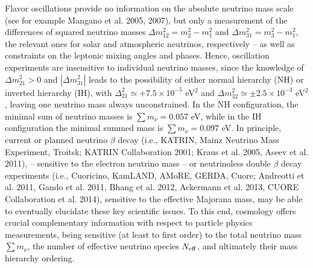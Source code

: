 \documentclass{emulateapj}
\begin{document}
Flavor oscillations provide no information on the absolute neutrino mass scale (see for example Mangano et al. 2005, 2007), 
but only a measurement of the differences of squared neutrino masses $\Delta m^2_{12}= m^2_2 - m^2_1$ and $\Delta m^2_{31} = m^2_3 - m^2_1$, the
relevant ones for solar and atmospheric neutrinos, respectively -- as well as constraints on the leptonic mixing angles and phases. Hence, oscillation experiments
are insensitive to individual neutrino masses, since the knowledge of
$\Delta m^2_{21} > 0$   and $| \Delta m ^2_{31}|$   leads to the possibility of either normal hierarchy (NH) or inverted hierarchy (IH), 
with $\Delta^2_{21} \simeq + 7.5 \times 10^{-5}$ eV$^{2}$  and $\Delta m_{32}^2 \simeq \pm 2.5 \times 10^{-3}$ eV$^2$,
leaving one neutrino mass always unconstrained.
In the NH configuration, the minimal sum of neutrino masses is $\sum m_{\nu} = 0.057$ eV, while in the IH configuration
the minimal summed mass is $\sum m_{\nu} = 0.097$ eV.
In principle, current or planned neutrino $\beta$ decay (i.e., KATRIN, Mainz Neutrino Mass Experiment, Troitsk; KATRIN Collaboration 2001; Kraus et al. 2005,  Aseev et al. 2011), -- sensitive to the electron neutrino mass --
or  neutrinoless double $\beta$ decay experiments (i.e., Cuoricino, KamLAND, AMoRE, GERDA, Cuore; Andreotti et al. 2011, Gando et al. 2011, Bhang et al. 2012, Ackermann et al. 2013, CUORE Collaboration et al. 2014),
sensitive to the effective Majorana mass, may be able to eventually elucidate these key scientific issues. 
To this end, cosmology offers crucial complementary information with respect to particle physics measurements, being sensitive (at least to first order) to the total neutrino mass $\sum m_{\nu}$,
the number of effective neutrino species $N_{\rm eff}$, and ultimately their mass hierarchy ordering.

\end{document}
